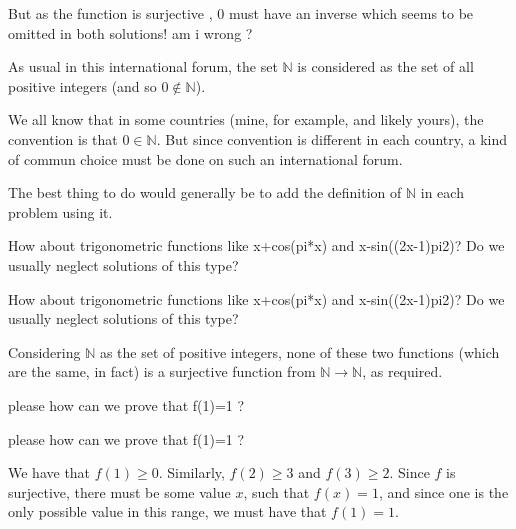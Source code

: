 \begin{solution}
	\begin{tcolorbox}But as the function is surjective , $0$ must have an inverse which seems to be omitted in both solutions! am i wrong ?\end{tcolorbox}

As usual in this international forum, the set $\mathbb N$ is considered as the set of all positive integers (and so $0\notin\mathbb N$).

We all know that in some countries (mine, for example, and likely yours), the convention is that $0\in\mathbb N$. But since convention is different in each country, a kind of commun choice must be done on such an international forum.

The best thing to do would generally be to add the definition of $\mathbb N$ in each problem using it. 
\end{solution}



\begin{solution}
	How about trigonometric functions like x+cos(pi*x) and x-sin((2x-1)pi\/2)? Do we usually neglect solutions of this type?
\end{solution}



\begin{solution}
	\begin{tcolorbox}How about trigonometric functions like x+cos(pi*x) and x-sin((2x-1)pi\/2)? Do we usually neglect solutions of this type?\end{tcolorbox}

Considering $\mathbb N$ as the set of positive integers, none of these two functions (which are the same, in fact) is a surjective function from $\mathbb N\to\mathbb N$, as required.
\end{solution}



\begin{solution}
	please how can we prove that f(1)=1 ?

\end{solution}



\begin{solution}
	\begin{tcolorbox}please how can we prove that f(1)=1 ?\end{tcolorbox}

We have that $f(1)\geq 0$. Similarly, $f(2)\geq3$ and $f(3)\geq 2$. Since $f$ is surjective, there must be some value $x$, such that $f(x)=1$, and since one is the only possible value in this range, we must have that $f(1)=1$.
\end{solution}



